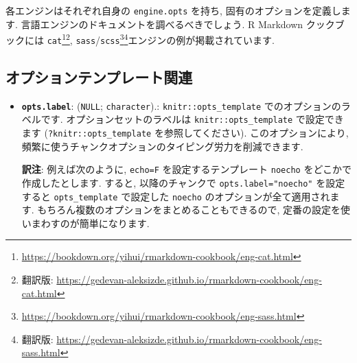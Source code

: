 \documentclass[
  11pt,
  lualatex,
  ja=standard]{bxjsreport}
\newenvironment{Shaded}{\begin{snugshade}}{\end{snugshade}}
\newcommand{\AttributeTok}[1]{\textcolor[rgb]{0.77,0.63,0.00}{#1}}
\newcommand{\FunctionTok}[1]{\textcolor[rgb]{0.00,0.00,0.00}{#1}}
\newcommand{\NormalTok}[1]{#1}
\newcommand{\SpecialCharTok}[1]{\textcolor[rgb]{0.00,0.00,0.00}{#1}}
\newcommand{\StringTok}[1]{\textcolor[rgb]{0.31,0.60,0.02}{#1}}
\renewcommand{\href}[2]{#2\footnote{\url{#1}}}
\begin{document}
\begin{itemize}
\begin{Shaded}
\end{Shaded}

  各エンジンはそれぞれ自身の \texttt{engine.opts} を持ち, 固有のオプションを定義します. 言語エンジンのドキュメントを調べるべきでしょう. R Markdown クックブックには \href{https://bookdown.org/yihui/rmarkdown-cookbook/eng-cat.html}{\texttt{cat}}\footnote{翻訳版: \url{https://gedevan-aleksizde.github.io/rmarkdown-cookbook/eng-cat.html}}, \href{https://bookdown.org/yihui/rmarkdown-cookbook/eng-sass.html}{\texttt{sass}/\texttt{scss}}\footnote{翻訳版: \url{https://gedevan-aleksizde.github.io/rmarkdown-cookbook/eng-sass.html}}エンジンの例が掲載されています.
\end{itemize}

\hypertarget{ux30aaux30d7ux30b7ux30e7ux30f3ux30c6ux30f3ux30d7ux30ecux30fcux30c8ux95a2ux9023}{%
\subsection{オプションテンプレート関連}\label{ux30aaux30d7ux30b7ux30e7ux30f3ux30c6ux30f3ux30d7ux30ecux30fcux30c8ux95a2ux9023}}

\begin{itemize}
\item
  \textbf{\texttt{opts.label}}: (\texttt{NULL}; \texttt{character}).: \texttt{knitr::opts\_template} でのオプションのラベルです. オプションセットのラベルは \texttt{knitr::opts\_template} で設定できます (\texttt{?knitr::opts\_template} を参照してください). このオプションにより, 頻繁に使うチャンクオプションのタイピング労力を削減できます.

  \textbf{訳注}: 例えば次のように, \texttt{echo=F} を設定するテンプレート \texttt{noecho} をどこかで作成したとします. すると, 以降のチャンクで \texttt{opts.label="noecho"} を設定すると \texttt{opts\_template} で設定した \texttt{noecho} のオプションが全て適用されます. もちろん複数のオプションをまとめることもできるので, 定番の設定を使いまわすのが簡単になります.

\begin{Shaded}
\end{Shaded}
\end{itemize}
\end{document}
